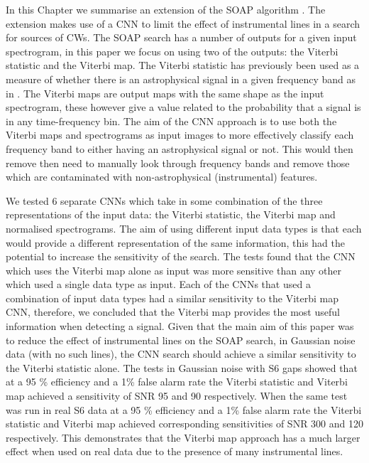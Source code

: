 %
In this Chapter we summarise an extension of the SOAP algorithm \citep{bayley2019SOAPGeneralised}.
The extension makes use of a \gls{CNN} to limit the effect of
instrumental lines in a search for sources of \glspl{CW}. 
The SOAP search has a number of outputs for a given input
spectrogram, in this paper we focus on using two of the outputs: the Viterbi statistic and the Viterbi map.
The Viterbi statistic has previously been used as a
measure of whether there is an astrophysical signal in a given frequency band as in \citep{bayley2019SOAPGeneralised}.
The Viterbi maps are output maps with the same shape as the input
spectrogram, these however give a value related to the probability that a signal is in any time-frequency bin. 
The aim of the \gls{CNN} approach is to use
both the Viterbi maps and spectrograms as input images to more effectively classify each
frequency band to either having an astrophysical signal or
not. This would then remove then need to manually look through frequency bands
and remove those which are contaminated with non-astrophysical (instrumental)
features. 

%
We tested 6 separate \glspl{CNN} which take in some combination of the three representations of the input data: the Viterbi statistic, the Viterbi map and normalised spectrograms. 
The aim of using different input data types is that each would
provide a different representation of the same information, this had
the potential to increase the sensitivity of the search. The tests found
that the \gls{CNN} which uses the Viterbi map alone as input was more sensitive
than any other which used a single data type as input. Each of the \glspl{CNN}
that used a combination of input data types had a similar sensitivity to the
Viterbi map \gls{CNN}, therefore, we concluded that the Viterbi map provides the most
useful information when detecting a signal.  Given that the main aim of this
paper was to reduce the effect of instrumental lines on the SOAP search, in
Gaussian noise data (with no such lines), the \gls{CNN} search should achieve a
similar sensitivity to the Viterbi statistic alone. The tests in Gaussian noise
with S6 gaps showed that at a 95 \% efficiency and a 1\% false alarm rate the
Viterbi statistic and Viterbi map achieved a sensitivity of SNR 95 and 90
respectively. When the same test was run in real S6 data at a 95 \% efficiency
and a 1\% false alarm rate the Viterbi statistic and Viterbi map achieved
corresponding sensitivities of SNR 300 and 120 respectively. This demonstrates
that the Viterbi map approach has a much larger effect when used on real data
due to the presence of many instrumental lines. 

